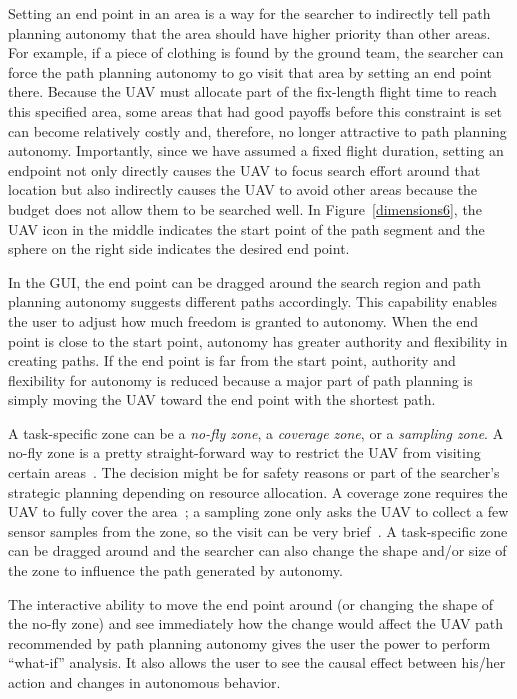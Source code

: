 \documentclass[lettersize, apacite, twoside, HRI]{apa_HRI}
\begin{document}
Setting an end point in an area is a way for the searcher to indirectly tell path planning autonomy that the area should have higher priority than other areas. For example, if a piece of clothing is found by the ground team, the searcher can force the path planning autonomy to go visit that area by setting an end point there. Because the UAV must allocate part of the fix-length flight time to reach this specified area, some areas that had good payoffs before this constraint is set can become relatively costly and, therefore, no longer attractive to path planning autonomy. Importantly, since we have assumed a fixed flight duration, setting an endpoint not only directly causes the UAV to focus search effort around that location but also indirectly causes the UAV to avoid other areas because the budget does not allow them to be searched well. In Figure~\ref{dimensions6}, the UAV icon in the middle indicates the start point of the path segment and the sphere on the right side indicates the desired end point. 

In the GUI, the end point can be dragged around the search region and path planning autonomy suggests different paths accordingly. This capability enables the user to adjust how much freedom is granted to autonomy. When the end point is close to the start point, autonomy has greater authority and flexibility in creating paths. If the end point is far from the start point, authority and flexibility for autonomy is reduced because a major part of path planning is simply moving the UAV toward the end point with the shortest path.

A task-specific zone can be a \textit{no-fly zone}, a \textit{coverage zone}, or a \textit{sampling zone}. A no-fly zone is a pretty straight-forward way to restrict the UAV from visiting certain areas~\cite{Clark2013Hierarchical,Jorris2009Three}. The decision might be for safety reasons or part of the searcher's strategic planning depending on resource allocation. A coverage zone requires the UAV to fully cover the area~\cite{Lin2009UAV}; a sampling zone only asks the UAV to collect a few sensor samples from the zone, so the visit can be very brief~\cite{Clark2013Hierarchical}. A task-specific zone can be dragged around and the searcher can also change the shape and/or size of the zone to influence the path generated by autonomy.

The interactive ability to move the end point around (or changing the shape of the no-fly zone) and see immediately how the change would affect the UAV path recommended by path planning autonomy gives the user the power to perform ``what-if'' analysis. It also allows the user to see the causal effect between his/her action and changes in autonomous behavior.
\end{document}
